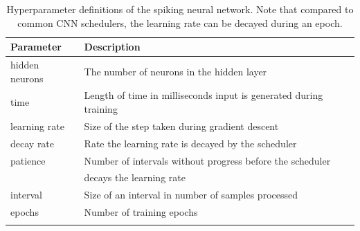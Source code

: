 \begin{longtable}[c]{@{}ll@{}}
\toprule
Parameter      & Description                                                               \\* \midrule
\endfirsthead
%
\endhead
%
\bottomrule
\endfoot
%
\endlastfoot
%
hidden neurons & The number of neurons in the hidden layer                                 \\
time           & Length of time in milliseconds input is generated during training \\
learning rate  & Size of the step taken during gradient descent                            \\
decay rate     & Rate the learning rate is decayed by the scheduler                        \\
patience       & Number of intervals without progress before the scheduler                 \\
               & decays the learning rate                                                  \\
interval       & Size of an interval in number of samples processed                        \\
epochs         & Number of training epochs                                                 \\* \bottomrule
\caption[Hyperparameter definitions of the spiking neural network]{Hyperparameter definitions of the spiking neural network. Note that compared to common CNN schedulers, the learning rate can be decayed during an epoch.}
\label{tab:bindsnet-hypers}
\end{longtable}
